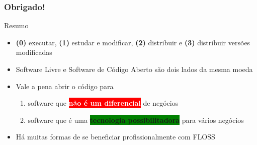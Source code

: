 \documentclass[xcolor=dvipsnames]{beamer}
\newcommand{\bred}[1]{\colorbox{red}{\textcolor{white}{#1}}}
\newcommand{\bgreen}[1]{\colorbox{green}{#1}}
\begin{document}
\begin{frame}
	\frametitle{Obrigado!}
\begin{block}{Resumo}
\begin{itemize}
\item {\bf (0)} executar, {\bf (1)} estudar e modificar, {\bf (2)} distribuir e {\bf (3)} distribuir versões modificadas
\item Software Livre e Software de Código Aberto são dois lados da mesma moeda 
\item Vale a pena abrir o código para\vspace{0.1cm}
	\begin{enumerate}
	\item software que \bred{\textbf{não é um diferencial}} de negócios
	\item software que é uma \bgreen{\textbf{tecnologia possibilitadora}} para vários negócios
	\end{enumerate}
\item Há muitas formas de se beneficiar profissionalmente com FLOSS
\end{itemize}
\end{block}

\end{frame}
\end{document}
